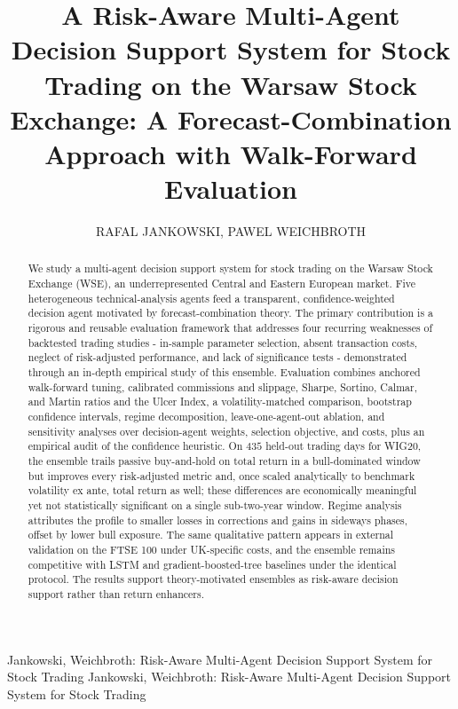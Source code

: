 \documentclass{ieeeaccess}
\newcommand{\OOSDays}{\ensuremath{435}}
\begin{document}

\title{A Risk-Aware Multi-Agent Decision Support System for Stock Trading on the Warsaw Stock Exchange: A Forecast-Combination Approach with Walk-Forward Evaluation}

\author{\uppercase{Rafal Jankowski},
\uppercase{Pawel Weichbroth}}

\address[1]{Faculty of Electronics, Telecommunications, and Informatics, Gdańsk University of Technology, 80-233 Gdańsk, Poland}
\address[2]{Faculty of Electronics, Telecommunications, and Informatics, Gdańsk University of Technology, 80-233 Gdańsk, Poland}


\markboth
{Jankowski, Weichbroth: Risk-Aware Multi-Agent Decision Support System for Stock Trading}
{Jankowski, Weichbroth: Risk-Aware Multi-Agent Decision Support System for Stock Trading}


\begin{abstract}
We study a multi-agent decision support system for stock trading on the Warsaw Stock Exchange (WSE), an underrepresented Central and Eastern European market. Five heterogeneous technical-analysis agents feed a transparent, confidence-weighted decision agent motivated by forecast-combination theory. The primary contribution is a rigorous and reusable evaluation framework that addresses four recurring weaknesses of backtested trading studies - in-sample parameter selection, absent transaction costs, neglect of risk-adjusted performance, and lack of significance tests - demonstrated through an in-depth empirical study of this ensemble. Evaluation combines anchored walk-forward tuning, calibrated commissions and slippage, Sharpe, Sortino, Calmar, and Martin ratios and the Ulcer Index, a volatility-matched comparison, bootstrap confidence intervals, regime decomposition, leave-one-agent-out ablation, and sensitivity analyses over decision-agent weights, selection objective, and costs, plus an empirical audit of the confidence heuristic. On \OOSDays{} held-out trading days for WIG20, the ensemble trails passive buy-and-hold on total return in a bull-dominated window but improves every risk-adjusted metric and, once scaled analytically to benchmark volatility ex ante, total return as well; these differences are economically meaningful yet not statistically significant on a single sub-two-year window. Regime analysis attributes the profile to smaller losses in corrections and gains in sideways phases, offset by lower bull exposure. The same qualitative pattern appears in external validation on the FTSE 100 under UK-specific costs, and the ensemble remains competitive with LSTM and gradient-boosted-tree baselines under the identical protocol. The results support theory-motivated ensembles as risk-aware decision support rather than return enhancers.
\end{abstract}
\end{document}
